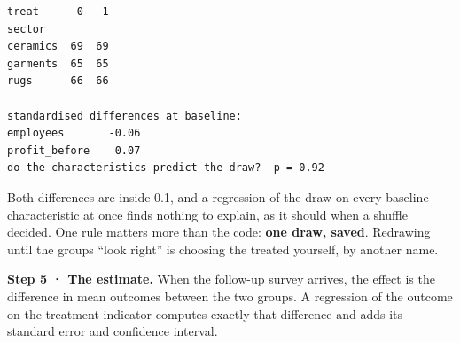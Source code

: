 \documentclass[
  letterpaper,
  10pt,
  twoside,
  openright,
  numbers=noenddot,
  chapterprefix=true]{scrbook}
\begin{document}
\begin{verbatim}
treat      0   1
sector          
ceramics  69  69
garments  65  65
rugs      66  66

standardised differences at baseline:
employees       -0.06
profit_before    0.07
do the characteristics predict the draw?  p = 0.92
\end{verbatim}

Both differences are inside 0.1, and a regression of the draw on every
baseline characteristic at once finds nothing to explain, as it should
when a shuffle decided. One rule matters more than the code: \textbf{one
draw, saved}. Redrawing until the groups ``look right'' is choosing the
treated yourself, by another name.

\textbf{Step 5 · The estimate.} When the follow-up survey arrives, the
effect is the difference in mean outcomes between the two groups. A
regression of the outcome on the treatment indicator computes exactly
that difference and adds its standard error and confidence interval.
\end{document}
